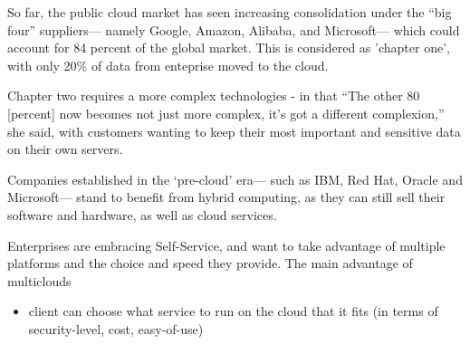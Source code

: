 So far, the public cloud market has seen increasing consolidation under the “big
four” suppliers— namely Google, Amazon, Alibaba, and Microsoft— which could
account for 84 percent of the global market. 
This is considered as 'chapter one', with only 20\% of data from enteprise moved to the cloud.


Chapter two requires a more complex technologies - in that “The other 80
[percent] now becomes not just more complex, it’s got a different complexion,”
she said, with customers wanting to keep their most important and sensitive data
on their own servers.

Companies established in the ‘pre-cloud’ era— such as IBM, Red Hat, Oracle and
Microsoft— stand to benefit from hybrid computing, as they can still sell their
software and hardware, as well as cloud services.




Enterprises are embracing Self-Service, and want to take advantage of multiple platforms and the choice and speed they provide. 
The main advantage of multiclouds
\begin{itemize}
  \item client can choose what service to run on the cloud that it fits (in terms of security-level, cost, easy-of-use)
\end{itemize}


